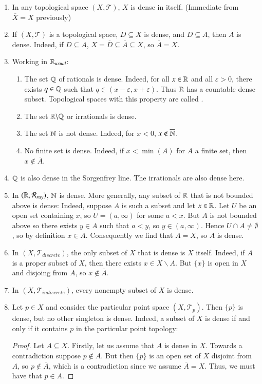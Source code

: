 \documentclass[12pt, a4paper, oneside, openright, titlepage]{book}
\begin{document}
\begin{eg}
    \leavevmode
    \begin{enumerate}
        \item In any topological space $(X,\mathcal{T})$, $X$ is dense in itself. (Immediate from $\overline{X} = X$ previously)
        \item If $(X,\mathcal{T})$ is a topological space, $D\subseteq X$ is dense, and $D \subseteq A$, then $A$ is dense. Indeed, if $D \subseteq A$, $X = \overline{D} \subseteq \overline{A} \subseteq X$, so $\overline{A} = X$.
        \item Working in $\mathbb R_{usual}$: \begin{enumerate}
                \item The set $\mathbb Q$ of rationals is dense. Indeed, for all $x \in \mathbb R$ and all $\varepsilon > 0$, there exists $q \in \mathbb Q$ such that $q \in (x-\varepsilon,x+\varepsilon)$. Thus $\mathbb R$ has a countable dense subset. Topological spaces with this property are called .
                \item The set $\mathbb R\backslash \mathbb Q$ or irrationals is dense.
                \item The set $\mathbb N$ is not dense. Indeed, for $x < 0$, $x \notin \overline{\mathbb N}$.
                \item No finite set is dense. Indeed, if $x < \min(A)$ for $A$ a finite set, then $x \notin \overline{A}$.
        \end{enumerate}
        \item $\mathbb Q$ is also dense in the Sorgenfrey line. The irrationals are also dense here.
        \item In $(\mathbb R,\mathcal{R}_{ray})$, $\mathbb N$ is dense. More generally, any subset of $\mathbb R$ that is not bounded above is dense: Indeed, suppose $A$ is such a subset and let $x \in \mathbb R$. Let $U$ be an open set containing $x$, so $U = (a,\infty)$ for some $a < x$. But $A$ is not bounded above so there exists $y \in A$ such that $a < y$, so $y \in (a,\infty)$. Hence $U\cap A \neq \emptyset$, so by definition $x \in \overline{A}$. Consequently we find that $\overline{A} = X$, so $A$ is dense.
        \item In $(X,\mathcal{T}_{discrete})$, the only subset of $X$ that is dense is $X$ itself. Indeed, if $A$ is a proper subset of $X$, then there exists $x \in X\backslash A$. But $\{x\}$ is open in $X$ and disjoing from $A$, so $x \notin \overline{A}$.
        \item In $(X,\mathcal{T}_{indiscrete})$, every nonempty subset of $X$ is dense.
        \item Let $p \in X$ and consider the particular point space $(X,\mathcal{T}_p)$. Then $\{p\}$ is dense, but no other singleton is dense. Indeed, a subset of $X$ is dense if and only if it contains $p$ in the particular point topology: \begin{proof}
                Let $A \subseteq X$. Firstly, let us assume that $A$ is dense in $X$. Towards a contradiction suppose $p \notin A$. But then $\{p\}$ is an open set of $X$ disjoint from $A$, so $p \notin \overline{A}$, which is a contradiction since we assume $\overline{A} = X$. Thus, we must have that $p \in A$.



\end{proof}
\end{enumerate}
\end{eg}
\end{document}
